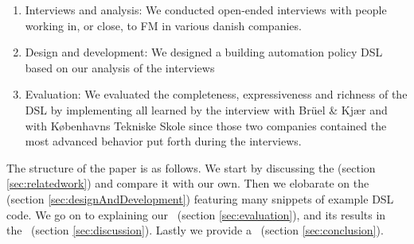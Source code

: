 \begin{enumerate}
	\item Interviews and analysis: We conducted open-ended interviews with people working in, or close, to FM in various danish companies.
	\item Design and development: We designed a building automation policy DSL based on our analysis of the interviews
	\item Evaluation: We evaluated the completeness, expressiveness and richness of the DSL by implementing all learned by the interview with Br\"{u}el \& Kj\ae r and with K\o benhavns Tekniske Skole since those two companies contained the most advanced behavior put forth during the interviews.
\end{enumerate}

The structure of the paper is as follows. We start by discussing the  (section \ref{sec:relatedwork}) and compare it with our own. Then we elobarate on the~  (section \ref{sec:designAndDevelopment}) featuring many snippets of example DSL code. We go on to explaining our~  (section \ref{sec:evaluation}), and its results in the~ (section \ref{sec:discussion}). Lastly we provide a~ (section \ref{sec:conclusion}).